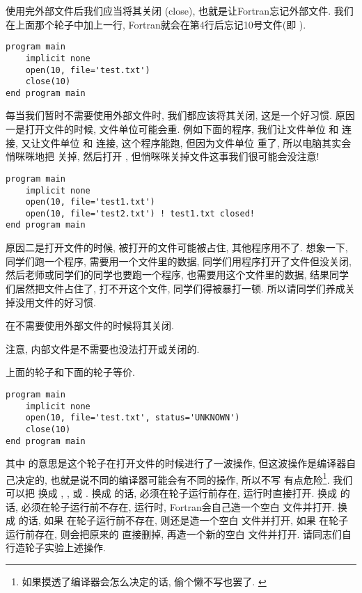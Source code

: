 使用完外部文件后我们应当将其关闭 (close), 也就是让Fortran忘记外部文件. 我们在上面那个轮子中加上一行, Fortran就会在第4行后忘记10号文件(即  ). 
\begin{lstlisting}
program main
    implicit none
    open(10, file='test.txt')
    close(10)
end program main
\end{lstlisting}

每当我们暂时不需要使用外部文件时, 我们都应该将其关闭, 这是一个好习惯. 原因一是打开文件的时候, 文件单位可能会重. 例如下面的程序, 我们让文件单位  和  连接, 又让文件单位  和  连接, 这个程序能跑, 但因为文件单位  重了, 所以电脑其实会悄咪咪地把  关掉, 然后打开 , 但悄咪咪关掉文件这事我们很可能会没注意!
\begin{lstlisting}
program main
    implicit none
    open(10, file='test1.txt')
    open(10, file='test2.txt') ! test1.txt closed!
end program main
\end{lstlisting}
原因二是打开文件的时候, 被打开的文件可能被占住, 其他程序用不了. 想象一下, 同学们跑一个程序, 需要用一个文件里的数据, 同学们用程序打开了文件但没关闭, 然后老师或同学们的同学也要跑一个程序, 也需要用这个文件里的数据, 结果同学们居然把文件占住了, 打不开这个文件, 同学们得被暴打一顿. 所以请同学们养成关掉没用文件的好习惯.
\begin{convention}
    在不需要使用外部文件的时候将其关闭.\label{close_external_file}
\end{convention}

注意, 内部文件是不需要也没法打开或关闭的. 

上面的轮子和下面的轮子等价. 
\begin{lstlisting}
program main
    implicit none
    open(10, file='test.txt', status='UNKNOWN')
    close(10)
end program main
\end{lstlisting}
其中   的意思是这个轮子在打开文件的时候进行了一波操作, 但这波操作是编译器自己决定的, 也就是说不同的编译器可能会有不同的操作, 所以不写  有点危险\footnote{如果摸透了编译器会怎么决定的话, 偷个懒不写也罢了. \label{no_add}}. 我们可以把  换成 , , 或 . 换成  的话,  必须在轮子运行前存在, 运行时直接打开. 换成  的话,  必须在轮子运行前不存在, 运行时, Fortran会自己造一个空白  文件并打开. 换成  的话, 如果  在轮子运行前不存在, 则还是造一个空白  文件并打开, 如果  在轮子运行前存在, 则会把原来的  直接删掉, 再造一个新的空白  文件并打开. 请同志们自行造轮子实验上述操作.

